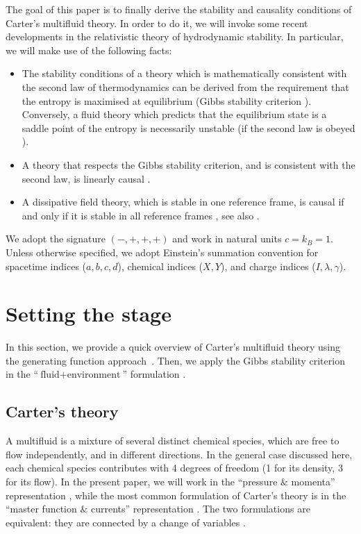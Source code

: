 \documentclass[a4paper, amsfonts, amssymb, amsmath, reprint, showkeys, nofootinbib, twoside, onecolumn,notitlepage]{revtex4-1}
\theoremstyle{definition}
\theoremstyle{theorem}
\begin{document}
The goal of this paper is to finally derive the stability and causality conditions of Carter's multifluid theory. In order to do it, we will invoke some recent developments in the relativistic theory of hydrodynamic stability. 
In particular, we will make use of the following facts: 
\begin{itemize}
\item The stability conditions of a theory which is mathematically consistent with the second law of thermodynamics can be derived from the requirement that the entropy is maximised at equilibrium (Gibbs stability criterion \cite{GavassinoGibbs2021}). Conversely, a fluid theory which predicts that the equilibrium state is a saddle point of the entropy is necessarily unstable (if the second law is obeyed \cite{GavassinoLyapunov_2020}).
\item A theory that respects the Gibbs stability criterion, and is consistent with the second law, is linearly causal \cite{GavassinoCausality2021}.
\item A dissipative field theory, which is stable in one reference frame, is causal if and only if it is stable in all reference frames \cite{GavassinoSuperluminal2021}, see also \cite{BemficaDNDefinitivo2020}.
\end{itemize}


We adopt the signature $(-,+,+,+)$ and work in natural units $c=k_B=1$. Unless otherwise specified, we adopt Einstein's summation convention for spacetime indices ($a,b,c,d$), chemical indices ($X,Y$), and charge indices ($I,\lambda,\gamma$).


\section{Setting the stage}

In this section, we provide a quick overview of Carter's multifluid theory using the generating function approach~\cite{GavassinoKhalatnikov2021}. Then, we apply the Gibbs stability criterion \cite{GavassinoGibbs2021} in the ``$\text{fluid}+\text{environment}$'' formulation  \cite{GavassinoCausality2021}.




\subsection{Carter's theory}\label{carterstheory}

A multifluid is a mixture of several distinct chemical species, which are free to flow independently, and in different directions. In the general case discussed here, each chemical species contributes with 4 degrees of freedom (1 for its density, 3 for its flow). In the present paper, we will work in the ``pressure $\&$ momenta'' representation \cite{lebedev1982}, while the most common formulation of Carter's theory is in the ``master function $\&$ currents'' representation \cite{andersson2007review}. The two formulations are equivalent: they are connected by a change of variables \cite{Carter_starting_point,Prix_single_vortex}.
\end{document}
